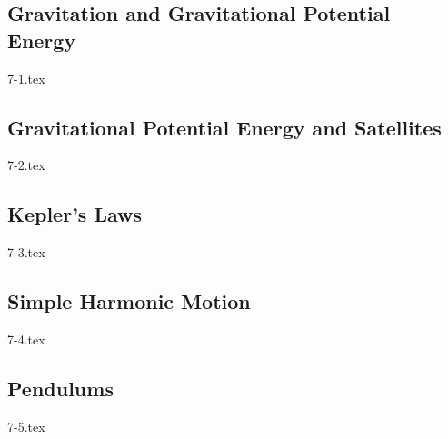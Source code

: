 \subsection{Gravitation and Gravitational Potential Energy}

{7-1.tex}

\subsection{Gravitational Potential Energy and Satellites}

{7-2.tex}

\subsection{Kepler's Laws}

{7-3.tex}

\subsection{Simple Harmonic Motion}

{7-4.tex}

\subsection{Pendulums}

{7-5.tex}